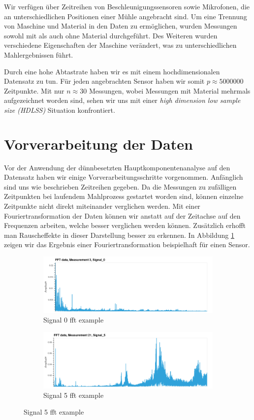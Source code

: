 Wir verfügen über Zeitreihen von Beschleunigungssensoren sowie Mikrofonen, die an unterschiedlichen Positionen einer Mühle angebracht sind. Um eine Trennung von Maschine und Material in den Daten zu ermöglichen, wurden Messungen sowohl mit als auch ohne Material durchgeführt. Des Weiteren wurden verschiedene Eigenschaften der Maschine verändert, was zu unterschiedlichen Mahlergebnissen führt. 

Durch eine hohe Abtastrate haben wir es mit einem hochdimensionalen Datensatz zu tun. Für jeden angebrachten Sensor haben wir somit $p \approx 5000000$ Zeitpunkte. Mit nur $n \approx 30$ Messungen, wobei Messungen mit Material mehrmals aufgezeichnet worden sind, sehen wir uns mit einer \textit{high dimension low sample size (HDLSS)} Situation konfrontiert. 

\section{Vorverarbeitung der Daten}
\label{preprocessing}

Vor der Anwendung der dünnbesetzten Hauptkomponentenanalyse auf den Datensatz haben wir einige Vorverarbeitungsschritte vorgenommen. Anfänglich sind uns wie beschrieben Zeitreihen gegeben. Da die Messungen zu zufälligen Zeitpunkten bei laufendem Mahlprozess gestartet worden sind, können einzelne Zeitpunkte nicht direkt miteinander verglichen werden. Mit einer Fouriertransformation der Daten können wir anstatt auf der Zeitachse auf den Frequenzen arbeiten, welche besser verglichen werden können. Zusätzlich erhofft man Rauscheffekte in dieser Darstellung besser zu erkennen. In Abbildung \ref{fft_example} zeigen wir das Ergebnis einer Fouriertransformation beispielhaft für einen Sensor.

\begin{figure}
\centering
\begin{subfigure}{0.9\textwidth}
\includegraphics[width=\textwidth]{figures/Signal_0_fft_example.png}
\caption{Signal 0 fft example}
\end{subfigure}
%
\begin{subfigure}{0.9\textwidth}
\includegraphics[width=\textwidth]{figures/Signal_5_fft_example.png}
\caption{Signal 5 fft example}
\end{subfigure}
\label{fft_example}
\end{figure}

